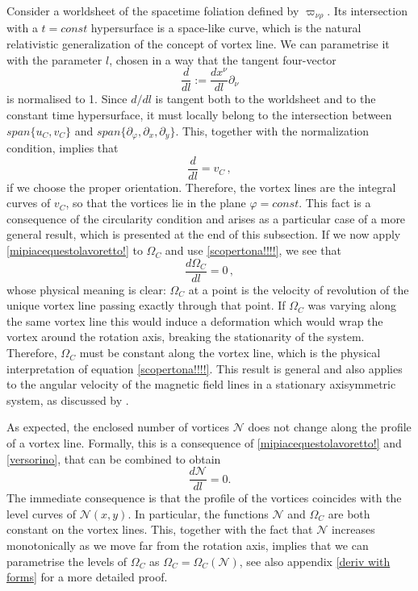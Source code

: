\documentclass[usenatbib%
]{mnras}
\begin{document}
Consider a worldsheet of the spacetime foliation defined by $\varpi_{\nu \rho}$. Its intersection with a $t=const$ hypersurface is a space-like curve, which is the natural relativistic generalization of the concept of vortex line. We can parametrise it with the parameter $l$, chosen in a way that the tangent four-vector
\begin{equation}
\dfrac{d}{dl} := \dfrac{d x^\nu}{dl} \partial_\nu  
\end{equation}
is normalised to 1. Since $d/dl$ is tangent both to the worldsheet and to the constant time hypersurface, it must locally belong to the intersection between $span\{ u_C, v_C\}$ and $span \{ \partial_\varphi , \partial_x, \partial_y \}$. This, together with the normalization condition, implies that
\begin{equation}\label{mipiacequestolavoretto!}
\dfrac{d}{dl} = v_C \, ,
\end{equation}
if we choose the proper orientation. Therefore, the vortex lines are the integral curves of $v_C$, so that the vortices  lie in the plane $\varphi = const$. This fact is a consequence of the circularity condition and arises as a particular case of a more general result, which is presented at the end of this subsection. 
If we now apply \eqref{mipiacequestolavoretto!} to $\Omega_C$ and use \eqref{scopertona!!!!}, we see that 
 \begin{equation}\label{ilprimo}
 \dfrac{d \Omega_C}{d l} =0 \, ,
 \end{equation}
whose physical meaning  is clear: $\Omega_C$ at a point is the velocity of revolution of the unique vortex line passing exactly through that point. If $\Omega_C$  was varying along the same vortex line this would induce a deformation which would wrap  the vortex  around the rotation axis, breaking the stationarity of the system. Therefore, $\Omega_C$ must be constant along the vortex line, which is the physical interpretation of equation \eqref{scopertona!!!!}. This result is general and also applies to the angular velocity of the magnetic field lines in a stationary axisymmetric system, as discussed by \cite{Gralla_jacobson2014}.

As expected, the enclosed number of vortices $\mathcal{N}$ does not change along the profile of a vortex line. Formally, this is a consequence of \eqref{mipiacequestolavoretto!} and \eqref{versorino}, that can be combined to obtain
\begin{equation}\label{ilsecondo}
\dfrac{d \mathcal{N}}{d l} =0 .
\end{equation}
The immediate consequence  is that  the profile of the vortices coincides with the level curves of $\mathcal{N}(x,y)$.
In particular, the functions $\mathcal{N}$ and $\Omega_C$ are both constant on the vortex lines. This, together with the fact that $\mathcal{N}$ increases monotonically as we move far from the rotation axis, implies that we can parametrise the levels of $\Omega_C$ as $\Omega_C=\Omega_C (\mathcal{N})$, see also appendix \ref{deriv with forms} for a more detailed proof.
\end{document}

